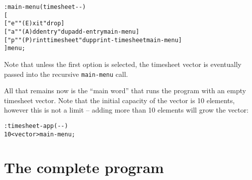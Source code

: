 \documentclass[english]{book}
\begin{document}
\begin{alltt}
: main-menu ( timesheet -{}- )
    {[}
        {[} "e" "(E)xit" drop {]}
        {[} "a" "(A)dd entry" dup add-entry main-menu {]}
        {[} "p" "(P)rint timesheet" dup print-timesheet main-menu {]}
    {]} menu ;
\end{alltt}

Note that unless the first option is selected, the timesheet vector is eventually passed into the recursive \texttt{main-menu} call.

All that remains now is the ``main word'' that runs the program with an empty timesheet vector. Note that the initial capacity of the vector is 10 elements, however this is not a limit -- adding more than 10 elements will grow the vector:

\begin{alltt}
: timesheet-app ( -{}- )
    10 <vector> main-menu ;
\end{alltt}

\section{The complete program}
\end{document}
